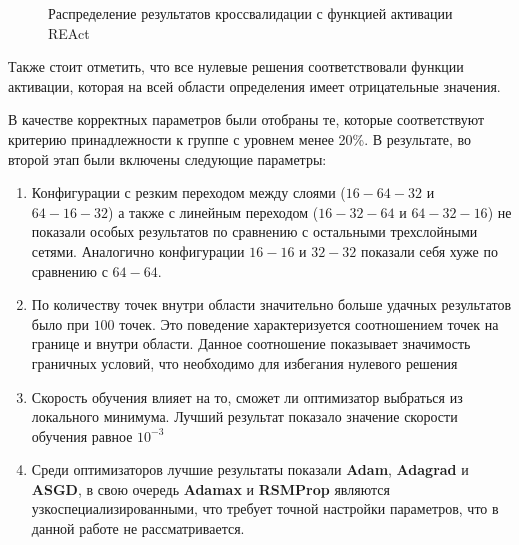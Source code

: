 \begin{figure}[ht]
    \centering
    \caption{Распределение результатов кроссвалидации с функцией активации REAct}
    \label{fig:couette_react_stat}
\end{figure}

Также стоит отметить, что все нулевые решения соответствовали функции активации,
которая на всей области определения имеет отрицательные значения.

В качестве корректных параметров были отобраны те, которые соответствуют критерию
принадлежности к группе с уровнем менее 20\%. В результате, во второй этап были
включены следующие параметры:
\begin{enumerate}
    \item Конфигурации с резким переходом между слоями ($16-64-32$ и $64-16-32$) а также
    с линейным переходом ($16-32-64$ и $64-32-16$) не показали особых результатов по
    сравнению с остальными трехслойными сетями. Аналогично конфигурации
    $16-16$ и $32-32$ показали себя хуже по сравнению с $64-64$.
    \item По количеству точек внутри области значительно больше удачных
    результатов было при $100$ точек. Это поведение характеризуется 
    соотношением точек на границе и внутри области. Данное соотношение 
    показывает значимость граничных условий, что необходимо для избегания
    нулевого решения
    \item Скорость обучения влияет на то, сможет ли оптимизатор 
    выбраться из локального минимума. Лучший результат показало значение
    скорости обучения равное $10^{-3}$
    \item Среди оптимизаторов лучшие результаты показали \textbf{Adam}, \textbf{Adagrad} и
    \textbf{ASGD}, в свою очередь \textbf{Adamax} и \textbf{RSMProp} являются узкоспециализированными,
    что требует точной настройки параметров, что в данной работе не рассматривается.
\end{enumerate} 

